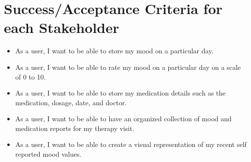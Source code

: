 \documentclass[11pt]{article}
\begin{document}
    \section{Success/Acceptance Criteria for each Stakeholder}\label{sec:success/acceptance-criteria-for-each-stakeholder}

    \begin{itemize}
        \item As a user, I want to be able to store my mood on a particular day.
        \item As a user, I want to be able to rate my mood on a particular day on a scale of 0 to 10.
        \item As a user, I want to be able to store my medication details such as the medication, dosage, date, and doctor.
        \item As a user, I want to be able to have an organized collection of mood and medication reports for my therapy visit.
        \item As a user, I want to be able to create a visual representation of my recent self reported mood values.
    \end{itemize}



%
\end{document}
